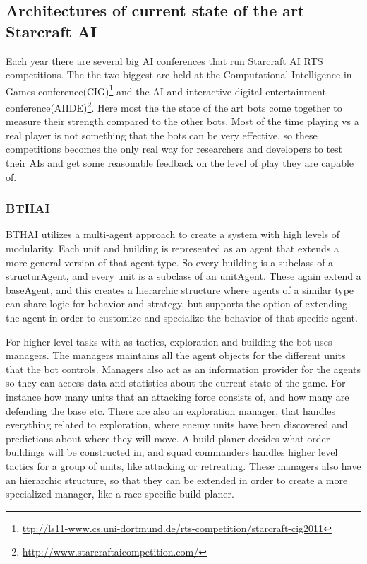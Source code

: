\subsection{Architectures of current state of the art Starcraft AI}
Each year there are several big AI conferences that run Starcraft AI RTS competitions. The the two biggest are held at the Computational Intelligence in Games conference(CIG)\footnote{\url{ttp://ls11-www.cs.uni-dortmund.de/rts-competition/starcraft-cig2011}} and the AI and interactive digital entertainment conference(AIIDE)\footnote{\url{http://www.starcraftaicompetition.com/}}. Here most the the state of the art bots come together to measure their strength compared to the other bots. Most of the time playing vs a real player is not something that the bots can be very effective, so these competitions becomes the only real way for researchers and developers to test their AIs and get some reasonable feedback on the level of play they are capable of.

\subsubsection{BTHAI}
BTHAI utilizes a multi-agent approach to create a system with high levels of modularity. Each unit and building is represented as an agent that extends a more general version of that agent type. So every building is a subclass of a structurAgent, and every unit is a subclass of an unitAgent. These again extend a baseAgent, and this creates a hierarchic structure where agents of a similar type can share logic for behavior and strategy, but supports the option of extending the agent in order to customize and specialize the behavior of that specific agent. 

For higher level tasks with as tactics, exploration and building the bot uses managers. The managers maintains all the agent objects for the different units that the bot controls. Managers also act as an information provider for the agents so they can access data and statistics about the current state of the game. For instance how many units that an attacking force consists of, and how many are defending the base etc. 
There are also an exploration manager, that handles everything related to exploration, where enemy units have been discovered and predictions about where they will move. A build planer decides what order buildings will be constructed in, and squad commanders handles higher level tactics for a group of units, like attacking or retreating. These managers also have an hierarchic structure, so that they can be extended in order to create a more specialized manager, like a race specific build planer. 

